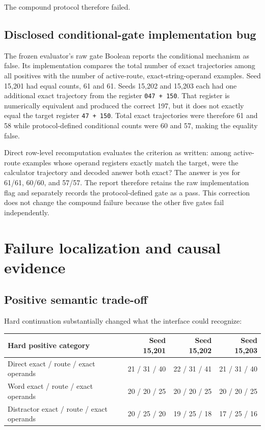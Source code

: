 \documentclass[11pt]{article}
\newcommand{\code}[1]{\texttt{#1}}
\begin{document}
The compound protocol therefore failed.

\subsection{Disclosed conditional-gate implementation bug}

The frozen evaluator's raw gate Boolean reports the conditional mechanism as
false. Its implementation compares the total number of exact trajectories
among all positives with the number of active-route, exact-string-operand
examples. Seed 15,201 had equal counts, 61 and 61. Seeds 15,202 and 15,203
each had one additional exact trajectory from the register
\code{047 + 150}. That register is numerically equivalent and produced the
correct 197, but it does not exactly equal the target register
\code{47 + 150}. Total exact trajectories were therefore 61 and 58 while
protocol-defined conditional counts were 60 and 57, making the equality false.

Direct row-level recomputation evaluates the criterion as written: among
active-route examples whose operand registers exactly match the target, were
the calculator trajectory and decoded answer both exact? The answer is yes for
61/61, 60/60, and 57/57. The report therefore retains the raw implementation
flag and separately records the protocol-defined gate as a pass. This
correction does not change the compound failure because the other five gates
fail independently.

\section{Failure localization and causal evidence}

\subsection{Positive semantic trade-off}

Hard continuation substantially changed what the interface could recognize:

\begin{center}
\small
\begin{tabular}{lrrr}
\toprule
Hard positive category & Seed 15,201 & Seed 15,202 & Seed 15,203\\
\midrule
Direct exact / route / exact operands
  & 21 / 31 / 40 & 22 / 31 / 41 & 21 / 31 / 40\\
Word exact / route / exact operands
  & 20 / 20 / 25 & 20 / 20 / 25 & 20 / 20 / 25\\
Distractor exact / route / exact operands
  & 20 / 25 / 20 & 19 / 25 / 18 & 17 / 25 / 16\\
\bottomrule
\end{tabular}
\end{center}
\end{document}
